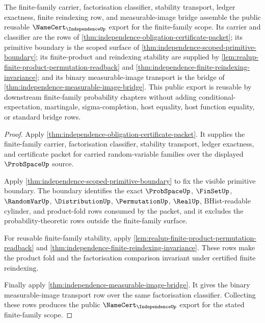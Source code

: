 \begin{theorem}
\label{thm:independence-public-namecert-export}
The finite-family carrier, factorisation classifier, stability transport, ledger exactness, finite reindexing row, and measurable-image bridge assemble the public reusable $\NameCert_{\IndependenceUp}$ export for the finite-family scope. Its carrier and classifier are the rows of \autoref{thm:independence-obligation-certificate-packet}; its primitive boundary is the scoped surface of \autoref{thm:independence-scoped-primitive-boundary}; its finite-product and reindexing stability are supplied by \autoref{lem:realup-finite-product-permutation-readback} and \autoref{thm:independence-finite-reindexing-invariance}; and its binary measurable-image transport is the bridge of \autoref{thm:independence-measurable-image-bridge}. This public export is reusable by downstream finite-family probability chapters without adding conditional-expectation, martingale, sigma-completion, host equality, host function equality, or standard bridge rows.
\end{theorem}
\begin{proof}
Apply \autoref{thm:independence-obligation-certificate-packet}. It supplies the finite-family carrier, factorisation classifier, stability transport, ledger exactness, and certificate packet for carried random-variable families over the displayed $\ProbSpaceUp$ source.

Apply \autoref{thm:independence-scoped-primitive-boundary} to fix the visible primitive boundary. The boundary identifies the exact $\ProbSpaceUp$, $\FinSetUp$, $\RandomVarUp$, $\DistributionUp$, $\PermutationUp$, $\RealUp$, BHist-readable cylinder, and product-fold rows consumed by the packet, and it excludes the probability-theoretic rows outside the finite-family surface.

For reusable finite-family stability, apply \autoref{lem:realup-finite-product-permutation-readback} and \autoref{thm:independence-finite-reindexing-invariance}. These rows make the product fold and the factorisation comparison invariant under certified finite reindexing.

Finally apply \autoref{thm:independence-measurable-image-bridge}. It gives the binary measurable-image transport row over the same factorisation classifier. Collecting these rows produces the public $\NameCert_{\IndependenceUp}$ export for the stated finite-family scope.
\end{proof}

